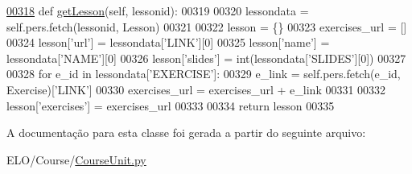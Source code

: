 \begin{DoxyCode}
\hypertarget{classCourse_1_1CourseUnit_1_1BusCourse_l00318}{}\hyperlink{classCourse_1_1CourseUnit_1_1BusCourse_adc4fcfde76feb1d6da3cf6bee39583b1}{00318}     \textcolor{keyword}{def }\hyperlink{classCourse_1_1CourseUnit_1_1BusCourse_adc4fcfde76feb1d6da3cf6bee39583b1}{getLesson}(self, lessonid):
00319 
00320         lessondata = self.pers.fetch(lessonid, Lesson)
00321 
00322         lesson = \{\}
00323         exercises\_url = []
00324         lesson[\textcolor{stringliteral}{'url'}] = lessondata[\textcolor{stringliteral}{'LINK'}][0]
00325         lesson[\textcolor{stringliteral}{'name'}] = lessondata[\textcolor{stringliteral}{'NAME'}][0]
00326         lesson[\textcolor{stringliteral}{'slides'}] = int(lessondata[\textcolor{stringliteral}{'SLIDES'}][0])
00327 
00328         \textcolor{keywordflow}{for} e\_id \textcolor{keywordflow}{in} lessondata[\textcolor{stringliteral}{'EXERCISE'}]:
00329             e\_link = self.pers.fetch(e\_id, Exercise)[\textcolor{stringliteral}{'LINK'}]
00330             exercises\_url = exercises\_url + e\_link
00331 
00332         lesson[\textcolor{stringliteral}{'exercises'}] = exercises\_url
00333 
00334         \textcolor{keywordflow}{return} lesson
00335 
\end{DoxyCode}


A documentação para esta classe foi gerada a partir do seguinte arquivo\+:\begin{DoxyCompactItemize}
\item 
E\+L\+O/\+Course/\hyperlink{CourseUnit_8py}{Course\+Unit.\+py}\end{DoxyCompactItemize}
